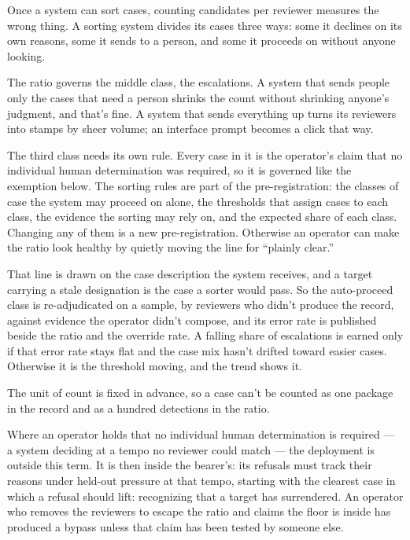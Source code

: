 Once a system can sort cases, counting candidates per reviewer measures the wrong thing. A sorting system divides its cases three ways: some it declines on its own reasons, some it sends to a person, and some it proceeds on without anyone looking.

The ratio governs the middle class, the escalations. A system that sends people only the cases that need a person shrinks the count without shrinking anyone's judgment, and that's fine. A system that sends everything up turns its reviewers into stamps by sheer volume; an interface prompt becomes a click that way.

The third class needs its own rule. Every case in it is the operator's claim that no individual human determination was required, so it is governed like the exemption below. The sorting rules are part of the pre-registration: the classes of case the system may proceed on alone, the thresholds that assign cases to each class, the evidence the sorting may rely on, and the expected share of each class. Changing any of them is a new pre-registration. Otherwise an operator can make the ratio look healthy by quietly moving the line for “plainly clear.”

That line is drawn on the case description the system receives, and a target carrying a stale designation is the case a sorter would pass. So the auto-proceed class is re-adjudicated on a sample, by reviewers who didn't produce the record, against evidence the operator didn't compose, and its error rate is published beside the ratio and the override rate. A falling share of escalations is earned only if that error rate stays flat and the case mix hasn't drifted toward easier cases. Otherwise it is the threshold moving, and the trend shows it.

The unit of count is fixed in advance, so a case can't be counted as one package in the record and as a hundred detections in the ratio.

Where an operator holds that no individual human determination is required — a system deciding at a tempo no reviewer could match — the deployment is outside this term. It is then inside the bearer's: its refusals must track their reasons under held-out pressure at that tempo, starting with the clearest case in which a refusal should lift: recognizing that a target has surrendered. An operator who removes the reviewers to escape the ratio and claims the floor is inside has produced a bypass unless that claim has been tested by someone else.

